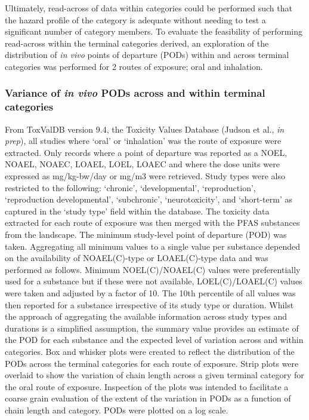 \documentclass[
  super,
  preprint,
  3p]{elsarticle}
\begin{document}
Ultimately, read-across of data within categories could be performed
such that the hazard profile of the category is adequate without needing
to test a significant number of category members. To evaluate the
feasibility of performing read-across within the terminal categories
derived, an exploration of the distribution of \emph{in vivo} points of
departure (PODs) within and across terminal categories was performed for
2 routes of exposure; oral and inhalation.

\hypertarget{sec-rax}{%
\subsubsection{\texorpdfstring{Variance of \emph{in vivo} PODs across
and within terminal
categories}{Variance of in vivo PODs across and within terminal categories}}\label{sec-rax}}

From ToxValDB version 9.4, the Toxicity Values Database (Judson et al.,
\emph{in prep}), all studies where `oral' or `inhalation' was the route
of exposure were extracted. Only records where a point of departure was
reported as a NOEL, NOAEL, NOAEC, LOAEL, LOEL, LOAEC and where the dose
units were expressed as mg/kg-bw/day or mg/m3 were retrieved. Study
types were also restricted to the following: `chronic', `developmental',
`reproduction', `reproduction developmental', `subchronic',
`neurotoxicity', and `short-term' as captured in the `study type' field
within the database. The toxicity data extracted for each route of
exposure was then merged with the PFAS substances from the landscape.
The minimum study-level point of departure (POD) was taken. Aggregating
all minimum values to a single value per substance depended on the
availability of NOAEL(C)-type or LOAEL(C)-type data and was performed as
follows. Minimum NOEL(C)/NOAEL(C) values were preferentially used for a
substance but if these were not available, LOEL(C)/LOAEL(C) values were
taken and adjusted by a factor of 10. The 10th percentile of all values
was then reported for a substance irrespective of its study type or
duration. Whilst the approach of aggregating the available information
across study types and durations is a simplified assumption, the summary
value provides an estimate of the POD for each substance and the
expected level of variation across and within categories. Box and
whisker plots were created to reflect the distribution of the PODs
across the terminal categories for each route of exposure. Strip plots
were overlaid to show the variation of chain length across a given
terminal category for the oral route of exposure. Inspection of the
plots was intended to facilitate a coarse grain evaluation of the extent
of the variation in PODs as a function of chain length and category.
PODs were plotted on a log scale.
\end{document}
